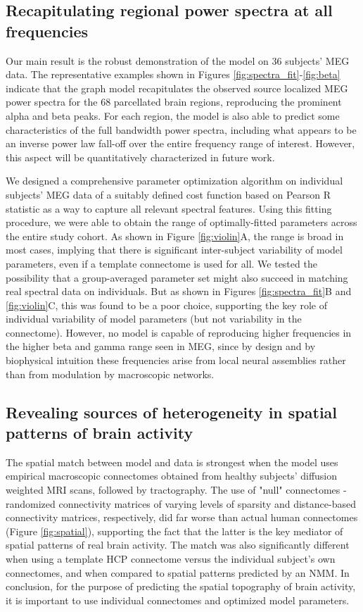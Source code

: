 \subsection{Recapitulating regional power spectra at all frequencies}

Our main result is the robust demonstration of the model on 36 subjects'
MEG data. The representative examples shown in Figures \ref{fig:spectra_fit}-\ref{fig:beta} indicate that the graph model recapitulates the observed source localized MEG power
spectra for the 68 parcellated brain regions, reproducing the prominent
alpha and beta peaks. For each region, the model is also able to predict
some characteristics of the full bandwidth power spectra, including what
appears to be an inverse power law fall-off over the entire frequency
range of interest. However, this aspect will be quantitatively
characterized in future work.

We designed a comprehensive parameter optimization algorithm on
individual subjects' MEG data of a suitably defined cost function based
on Pearson R statistic as a way to capture all relevant spectral
features. Using this fitting procedure, we were able to obtain the range
of optimally-fitted parameters across the entire study cohort. As shown
in Figure \ref{fig:violin}A, the range is broad in most cases, implying that there is
significant inter-subject variability of model parameters, even if a
template connectome is used for all. We tested the possibility that a
group-averaged parameter set might also succeed in matching real
spectral data on individuals. But as shown in Figures \ref{fig:spectra_fit}B and \ref{fig:violin}C, this
was found to be a poor choice, supporting the key role of individual
variability of model parameters (but not variability in the connectome).
However, no model is capable of reproducing higher frequencies in the
higher beta and gamma range seen in MEG, since by design and by
biophysical intuition these frequencies arise from local neural
assemblies rather than from modulation by macroscopic networks.

\subsection{Revealing sources of heterogeneity in spatial patterns of brain
activity}

The spatial match between model and data is strongest when the model
uses empirical macroscopic connectomes obtained from healthy subjects'
diffusion weighted MRI scans, followed by tractography. The use of
"null" connectomes - randomized connectivity matrices of varying
levels of sparsity and distance-based connectivity matrices,
respectively, did far worse than actual human connectomes (Figure \ref{fig:spatial}),
supporting the fact that the latter is the key mediator of spatial
patterns of real brain activity. The match was also significantly
different when using a template HCP connectome versus the individual
subject's own connectomes, and when compared to spatial
patterns predicted by an NMM. In conclusion, for the purpose of
predicting the spatial topography of brain activity, it is important to
use individual connectomes and optimized model parameters.

